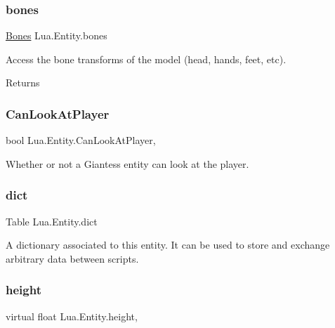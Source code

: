 \subsubsection{\texorpdfstring{bones}{bones}}
{\footnotesize\ttfamily \mbox{\hyperlink{class_lua_1_1_bones}{Bones}} Lua.\+Entity.\+bones\hspace{0.3cm}{\ttfamily [get]}}



Access the bone transforms of the model (head, hands, feet, etc). 

\begin{DoxyReturn}{Returns}

\end{DoxyReturn}
\mbox{\label{class_lua_1_1_entity_a7dfc341caa3b11cc42ef45226689741c}} 
\subsubsection{\texorpdfstring{CanLookAtPlayer}{CanLookAtPlayer}}
{\footnotesize\ttfamily bool Lua.\+Entity.\+Can\+Look\+At\+Player\hspace{0.3cm}{\ttfamily [get]}, {\ttfamily [set]}}



Whether or not a Giantess entity can look at the player. 

\mbox{\label{class_lua_1_1_entity_ae0c707512eed832f2211ace61d3be75d}} 
\subsubsection{\texorpdfstring{dict}{dict}}
{\footnotesize\ttfamily Table Lua.\+Entity.\+dict\hspace{0.3cm}{\ttfamily [get]}}



A dictionary associated to this entity. It can be used to store and exchange arbitrary data between scripts. 

\mbox{\label{class_lua_1_1_entity_a6b6baf8292fe2447ad0620722bc24526}} 
\subsubsection{\texorpdfstring{height}{height}}
{\footnotesize\ttfamily virtual float Lua.\+Entity.\+height\hspace{0.3cm}{\ttfamily [get]}, {\ttfamily [set]}}




